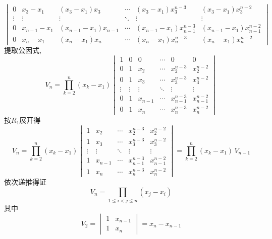 \begin{questions}
\begin{solution}
\[\begin{vmatrix}
        0 & x_3-x_1 & (x_3-x_1)x_3 & \cdots & (x_3-x_1)x_3^{n-3} & (x_3-x_1)x_3^{n-2} \\
        \vdots & \vdots & \vdots & \ddots & \vdots & \vdots \\
        0 & x_{n-1}-x_1 & (x_{n-1}-x_1)x_{n-1} & \cdots & (x_{n-1}-x_1)x_{n-1}^{n-3} & (x_{n-1}-x_1)x_{n-1}^{n-2} \\
        0 & x_n-x_1 & (x_n-x_1)x_n & \cdots & (x_n-x_1)x_n^{n-3} & (x_n-x_1)x_n^{n-2}
        \end{vmatrix} 
        \]
        提取公因式,
        \[
        V_n= \prod_{k=2}^{n} (x_k-x_1)
        \begin{vmatrix}
        1 & 0 & 0 & \cdots & 0 & 0 \\
        0 & 1 & x_2 & \cdots & x_2^{n-3} & x_2^{n-2} \\
        0 & 1 & x_3 & \cdots & x_3^{n-3} & x_3^{n-2} \\
        \vdots & \vdots & \vdots & \ddots & \vdots & \vdots \\
        0 & 1 & x_{n-1} & \cdots & x_{n-1}^{n-3} & x_{n-1}^{n-2} \\
        0 & 1 & x_n & \cdots & x_n^{n-3} & x_n^{n-2}
        \end{vmatrix}
        \]
        按$R_1$展开得
        \[
        V_n = \prod_{k=2}^{n} (x_k-x_1)
        \begin{vmatrix}
        1 & x_2 & \cdots & x_2^{n-3} & x_2^{n-2} \\
        1 & x_3 & \cdots & x_3^{n-3} & x_3^{n-2} \\
        \vdots & \vdots & \ddots & \vdots & \vdots \\
        1 & x_{n-1} & \cdots & x_{n-1}^{n-3} & x_{n-1}^{n-2} \\
        1 & x_n & \cdots & x_n^{n-3} & x_n^{n-2}
        \end{vmatrix}
        = \prod_{k=2}^{n}(x_k-x_1)\,V_{n-1}
        \]
        依次递推得证
        \[
        V_n = \prod_{1 \le i < j \le n} (x_j - x_i)
        \]
        其中
        \[
        V_2=\begin{vmatrix}1 & x_{n-1}\\1 & x_n\end{vmatrix}=x_n-x_{n-1}
        \]
    \end{solution}


\end{questions}
